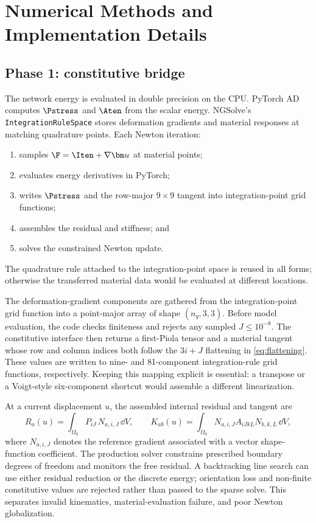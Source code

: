 \chapter{Numerical Methods and Implementation Details}
\label{ch:implementation}

\section{Phase 1: constitutive bridge}

The network energy is evaluated in double precision on the CPU. PyTorch AD
computes \(\Pstress\) and \(\Aten\) from the scalar energy. NGSolve's
\texttt{IntegrationRuleSpace} stores deformation gradients and material
responses at matching quadrature points. Each Newton iteration:
\begin{enumerate}
  \item samples \(\F=\Iten+\nabla\bm u\) at material points;
  \item evaluates energy derivatives in PyTorch;
  \item writes \(\Pstress\) and the row-major \(9\times9\) tangent into
        integration-point grid functions;
  \item assembles the residual and stiffness; and
  \item solves the constrained Newton update.
\end{enumerate}
The quadrature rule attached to the integration-point space is reused in all
forms; otherwise the transferred material data would be evaluated at
different locations.

The deformation-gradient components are gathered from the integration-point
grid function into a point-major array of shape \((n_q,3,3)\). Before model
evaluation, the code checks finiteness and rejects any sampled \(J\leq10^{-8}\).
The constitutive interface then returns a first-Piola tensor and a material
tangent whose row and column indices both follow the \(3i+J\) flattening in
\cref{eq:flattening}. These values are written to nine- and 81-component
integration-rule grid functions, respectively. Keeping this mapping
explicit is essential: a transpose or a Voigt-style six-component shortcut
would assemble a different linearization.

At a current displacement \(u\), the assembled internal residual and tangent
are
\begin{equation}
  R_a(u)=\int_{\Omega_0} P_{iJ}\,N_{a,i,J}\,\dd V,
  \qquad
  K_{ab}(u)=\int_{\Omega_0}
  N_{a,i,J}A_{iJkL}N_{b,k,L}\,\dd V,
  \label{eq:bridge-residual-tangent}
\end{equation}
where \(N_{a,i,J}\) denotes the reference gradient associated with a vector
shape-function coefficient. The production solver constrains prescribed
boundary degrees of freedom and monitors the free residual. A backtracking
line search can use either residual reduction or the discrete energy;
orientation loss and non-finite constitutive values are rejected rather than
passed to the sparse solve. This separates invalid kinematics,
material-evaluation failure, and poor Newton globalization.

